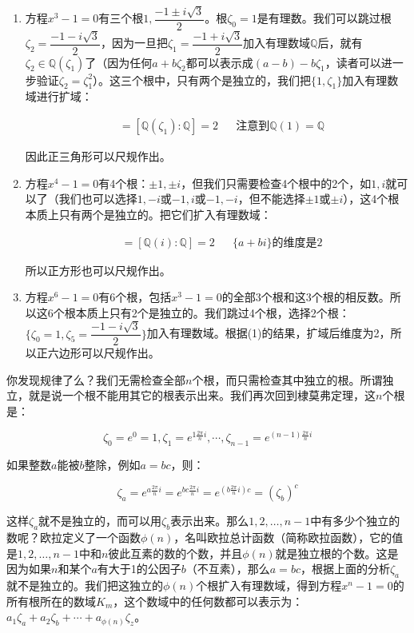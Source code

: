\begin{enumerate}[(1)]
\item 方程$x^3 - 1 = 0$有三个根$1, \dfrac{-1 \pm i\sqrt{3}}{2}$。根$\zeta_0 = 1$是有理数。我们可以跳过根$\zeta_2 = \dfrac{-1 - i\sqrt{3}}{2}$，因为一旦把$\zeta_1 = \dfrac{-1 + i\sqrt{3}}{2}$加入有理数域$\mathbb{Q}$后，就有$\zeta_2 \in \mathbb{Q}(\zeta_1)$了（因为任何$a + b \zeta_2$都可以表示成$(a - b) - b \zeta_1$，读者可以进一步验证$\zeta_2 = \zeta_1^2$）。这三个根中，只有两个是独立的，我们把$\{1, \zeta_1\}$加入有理数域进行扩域：

\begin{align*}
[\mathbb{Q}(1, \zeta_1) : \mathbb{Q}] &= [\mathbb{Q}(\zeta_1) : \mathbb{Q}] = 2  && \text{注意到}\mathbb{Q}(1) = \mathbb{Q}
\end{align*}

因此正三角形可以尺规作出。

\item 方程$x^4 - 1 = 0$有4个根：$\pm 1, \pm i$，但我们只需要检查4个根中的2个，如$1, i$就可以了（我们也可以选择$1, -i$或$-1, i$或$-1, -i$，但不能选择$\pm 1$或$\pm i$），这4个根本质上只有两个是独立的。把它们扩入有理数域：

\begin{align*}
[\mathbb{Q}(1, i) : \mathbb{Q}] &= [\mathbb{Q}(i) : \mathbb{Q}] = 2 && \{a + bi\}\text{的维度是2}
\end{align*}

所以正方形也可以尺规作出。

\item 方程$x^6 - 1 = 0$有6个根，包括$x^3 - 1 = 0$的全部3个根和这3个根的相反数。所以这6个根本质上只有2个是独立的。我们跳过4个根，选择2个根：$\{\zeta_0 = 1, \zeta_5 = \dfrac{-1 - i\sqrt{3}}{2}\}$加入有理数域。根据(1)的结果，扩域后维度为2，所以正六边形可以尺规作出。
\end{enumerate}

你发现规律了么？我们无需检查全部$n$个根，而只需检查其中独立的根。所谓独立，就是说一个根不能用其它的根表示出来。我们再次回到棣莫弗定理，这$n$个根是：

\[
\zeta_0 = e^0 = 1, \zeta_1 = e^{1\frac{2\pi}{n}i}, \dotsb, \zeta_{n-1} = e^{(n - 1)\frac{2\pi}{n}i}
\]

如果整数$a$能被$b$整除，例如$a = bc$，则：

\[
\zeta_a = e^{a\frac{2\pi}{n}i} = e^{bc\frac{2\pi}{n}i} = e^{(b\frac{2\pi}{n}i)c} = (\zeta_b)^c
\]

这样$\zeta_a$就不是独立的，而可以用$\zeta_b$表示出来。那么$1, 2, \dotsc, n-1$中有多少个独立的数呢？欧拉定义了一个函数$\phi(n)$，名叫欧拉总计函数（简称欧拉函数），它的值是$1, 2, \dotsc, n-1$中和$n$彼此互素的数的个数，并且$\phi(n)$就是独立根的个数。这是因为如果$n$和某个$a$有大于1的公因子$b$（不互素），那么$a = bc$，根据上面的分析$\zeta_a$就不是独立的。我们把这独立的$\phi(n)$个根扩入有理数域，得到方程$x^n -1 = 0$的所有根所在的数域$K_m$，这个数域中的任何数都可以表示为：$a_1 \zeta_a + a_2\zeta_b + \dotsb + a_{\phi(n)}\zeta_z$。

